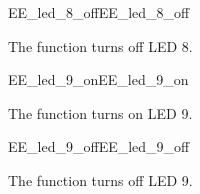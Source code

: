 \begin{function_nopb2}{EE\_led\_8\_off}{EE_led_8_off}
  
  \begin{fundescription}
    The function turns off LED 8.
  \end{fundescription}
  
  
  
\end{function_nopb2}

\begin{function_nopb2}{EE\_led\_9\_on}{EE_led_9_on}
  
  \begin{fundescription}
    The function turns on LED 9.
  \end{fundescription}
  
  
  
\end{function_nopb2}

\begin{function_nopb2}{EE\_led\_9\_off}{EE_led_9_off}
  
  \begin{fundescription}
    The function turns off LED 9.
  \end{fundescription}
  
  
  
\end{function_nopb2}

